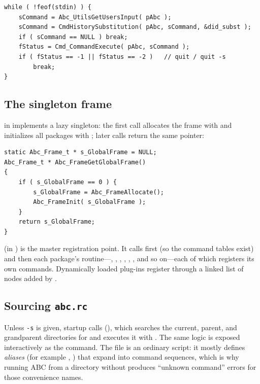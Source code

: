 \begin{lstlisting}[style=abccode]
while ( !feof(stdin) ) {
    sCommand = Abc_UtilsGetUsersInput( pAbc );
    sCommand = CmdHistorySubstitution( pAbc, sCommand, &did_subst );
    if ( sCommand == NULL ) break;
    fStatus = Cmd_CommandExecute( pAbc, sCommand );
    if ( fStatus == -1 || fStatus == -2 )   // quit / quit -s
        break;
}
\end{lstlisting}

\subsection{The singleton frame}

 in  implements a
lazy singleton: the first call allocates the frame with 
and initializes all packages with ; later calls return the
same pointer:

\begin{lstlisting}[style=abccode]
static Abc_Frame_t * s_GlobalFrame = NULL;
Abc_Frame_t * Abc_FrameGetGlobalFrame()
{
    if ( s_GlobalFrame == 0 ) {
        s_GlobalFrame = Abc_FrameAllocate();
        Abc_FrameInit( s_GlobalFrame );
    }
    return s_GlobalFrame;
}
\end{lstlisting}

 (in ) is the master
registration point. It calls  first (so the command tables
exist) and then each package's  routine---,
, , , , ,
and so on---each of which registers its own commands. Dynamically loaded
plug-ins register through a linked list of  nodes
added by .

\subsection{Sourcing \texttt{abc.rc}}

Unless \texttt{-s} is given, startup calls 
(), which searches the current, parent, and
grandparent directories for  and executes it with .
The same logic is exposed interactively as the  command. The
 file is an ordinary script: it mostly defines \emph{aliases}
(for example , ) that expand into command sequences,
which is why running ABC from a directory without  produces
``unknown command'' errors for those convenience names.

